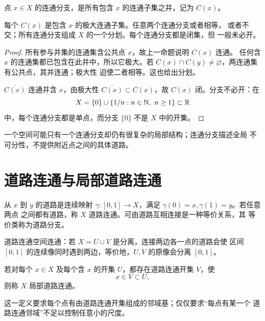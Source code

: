 \begin{definition}[连通分支]
点 \(x\in X\) 的连通分支，是所有包含 \(x\) 的连通子集之并，记为
\(C(x)\)。
\end{definition}

\begin{theorem}[连通分支的基本性质]
\label{thm:connected-components-basic}
每个 \(C(x)\) 是包含 \(x\) 的极大连通子集。任意两个连通分支或者相等，
或者不交；所有连通分支组成 \(X\) 的一个分划。每个连通分支都是闭集，但
一般未必开。
\end{theorem}

\begin{proof}
所有参与并集的连通集含公共点 \(x\)，故上一命题说明 \(C(x)\) 连通。
任何含 \(x\) 的连通集都已包含在此并中，所以它极大。若
\(C(x)\cap C(y)\ne\varnothing\)，两连通集有公共点，其并连通；极大性
迫使二者相等。这也给出分划。

\(\overline{C(x)}\) 连通并含 \(x\)，由极大性
\(\overline{C(x)}\subset C(x)\)，故 \(C(x)\) 闭。分支不必开：在
\[
 X=\{0\}\cup\{1/n:n\in\N,\ n\ge1\}\subset\R
\]
中，每个连通分支都是单点，而分支 \(\{0\}\) 不是 \(X\) 中的开集。
\end{proof}

一个空间可能只有一个连通分支却仍有很复杂的局部结构；连通分支描述全局
不可分性，不提供附近点之间的具体道路。

\section{道路连通与局部道路连通}

\begin{definition}[道路与道路分支]
从 \(x\) 到 \(y\) 的道路是连续映射
\(\gamma:[0,1]\to X\)，满足 \(\gamma(0)=x,\gamma(1)=y\)。若任意两点
之间都有道路，称 \(X\) 道路连通。可由道路互相连接是一种等价关系，其
等价类称为道路分支。
\end{definition}

道路连通空间连通：若 \(X=U\cup V\) 是分离，连接两边各一点的道路会使
区间 \([0,1]\) 的连续像同时遇到两边，等价地，\(U,V\) 的原像会分离
\([0,1]\)。

\begin{definition}[局部道路连通]
若对每个 \(x\in X\) 及每个含 \(x\) 的开集 \(U\)，都存在道路连通开集
\(V\)，使
\[
 x\in V\subset U,
\]
则称 \(X\) 局部道路连通。
\end{definition}

这一定义要求每个点有由道路连通开集组成的邻域基；仅仅要求“每点有某一个
道路连通邻域”不足以控制任意小的尺度。

